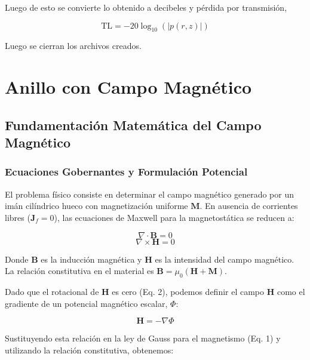 Luego de esto se convierte lo obtenido a decibeles y pérdida por transmisión,

\begin{equation*}
    \text{TL} = -20 \log_{10} \left( \left| p(r,z) \right| \right)
\end{equation*}

Luego se cierran los archivos creados.

\section{Anillo con Campo Magnético}


\subsection{Fundamentación Matemática del Campo Magnético}

\subsubsection{Ecuaciones Gobernantes y Formulación Potencial}
El problema físico consiste en determinar el campo magnético generado por un imán cilíndrico hueco con magnetización uniforme $\mathbf{M}$. En ausencia de corrientes libres ($\mathbf{J}_f = 0$), las ecuaciones de Maxwell para la magnetostática se reducen a:

\begin{equation}
    \nabla \cdot \mathbf{B} = 0
\end{equation}
\begin{equation}
    \nabla \times \mathbf{H} = 0
\end{equation}

Donde $\mathbf{B}$ es la inducción magnética y $\mathbf{H}$ es la intensidad del campo magnético. La relación constitutiva en el material es $\mathbf{B} = \mu_0 (\mathbf{H} + \mathbf{M})$.

Dado que el rotacional de $\mathbf{H}$ es cero (Eq. 2), podemos definir el campo $\mathbf{H}$ como el gradiente de un potencial magnético escalar, $\Phi$:

\begin{equation}
    \mathbf{H} = -\nabla \Phi
\end{equation}

Sustituyendo esta relación en la ley de Gauss para el magnetismo (Eq. 1) y utilizando la relación constitutiva, obtenemos:

